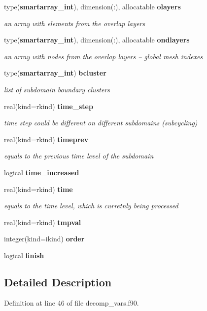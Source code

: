 \begin{DoxyCompactItemize}
type({\bf smartarray\+\_\+int}), dimension(\+:), allocatable {\bf olayers}
\begin{DoxyCompactList}\small\item\em an array with elements from the overlap layers \end{DoxyCompactList}\item 
type({\bf smartarray\+\_\+int}), dimension(\+:), allocatable {\bf ondlayers}
\begin{DoxyCompactList}\small\item\em an array with nodes from the overlap layers -- global mesh indexes \end{DoxyCompactList}\item 
type({\bf smartarray\+\_\+int}) {\bf bcluster}
\begin{DoxyCompactList}\small\item\em list of subdomain boundary clusters \end{DoxyCompactList}\item 
real(kind=rkind) {\bf time\+\_\+step}
\begin{DoxyCompactList}\small\item\em time step could be different on different subdomains (subcycling) \end{DoxyCompactList}\item 
real(kind=rkind) {\bf timeprev}
\begin{DoxyCompactList}\small\item\em equals to the previous time level of the subdomain \end{DoxyCompactList}\item 
logical {\bf time\+\_\+increased}
\item 
real(kind=rkind) {\bf time}
\begin{DoxyCompactList}\small\item\em equals to the time level, which is curretnly being processed \end{DoxyCompactList}\item 
real(kind=rkind) {\bf tmpval}
\item 
integer(kind=ikind) {\bf order}
\item 
logical {\bf finish}
\end{DoxyCompactItemize}


\subsection{Detailed Description}


Definition at line 46 of file decomp\+\_\+vars.\+f90.



